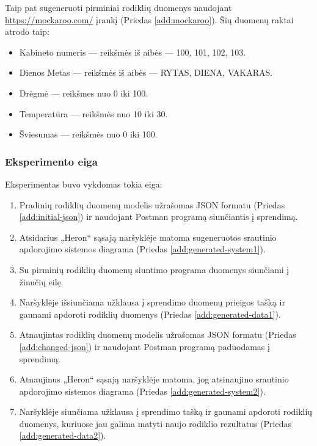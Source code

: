 \documentclass{VUMIFPSbakalaurinis}
\begin{document}
\pagebreak
Taip pat sugeneruoti pirminiai rodiklių duomenys naudojant \url{https://mockaroo.com/} įrankį (Priedas \ref{add:mockaroo}). Šių duomenų raktai atrodo taip:
\begin{itemize}
    \item Kabineto numeris — reikšmės iš aibės — 100, 101, 102, 103.
    \item Dienos Metas — reikšmės iš aibės — RYTAS, DIENA, VAKARAS.
    \item Drėgmė — reikšmes nuo 0 iki 100.
    \item Temperatūra — reikšmės nuo 10 iki 30.
    \item Šviesumas — reikšmės nuo 0 iki 100.
\end{itemize}

\subsubsection{Eksperimento eiga}

Eksperimentas buvo vykdomas tokia eiga:
\begin{enumerate}
    \item Pradinių rodiklių duomenų modelis užrašomas JSON formatu (Priedas \ref{add:initial-json}) ir naudojant Postman programą siunčiantis į sprendimą.
    \item Atsidarius „Heron“ sąsają naršyklėje matoma sugeneruotos srautinio apdorojimo sistemos diagrama (Priedas \ref{add:generated-system1}).
    \item Su pirminių rodiklių duomenų siuntimo programa duomenys siunčiami į žinučių eilę.
    \item Naršyklėje išsiunčiama užklausa į sprendimo duomenų prieigos tašką ir gaunami apdoroti rodiklių duomenys (Priedas \ref{add:generated-data1}).
    \item Atnaujintas rodiklių duomenų modelis užrašomas JSON formatu (Priedas \ref{add:changed-json}) ir naudojant Postman programą paduodamas į sprendimą.
    \item Atnaujinus „Heron“ sąsają naršyklėje matoma, jog atsinaujino srautinio apdorojimo sistemos diagrama (Priedas \ref{add:generated-system2}).
    \item Naršyklėje siunčiama užklausa į sprendimo tašką ir gaunami apdoroti rodiklių duomenys, kuriuose jau galima matyti naujo rodiklio rezultatus (Priedas \ref{add:generated-data2}).
\end{enumerate}
\end{document}
